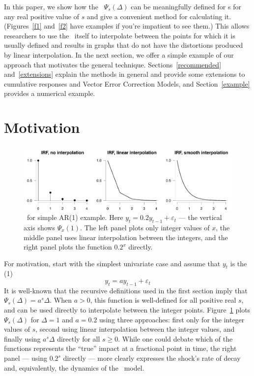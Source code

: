 \documentclass[12pt,fleqn]{article}
\newcommand{\vep}{\varepsilon}
\newcommand{\AR}{\allcaps{AR}}
\begin{document}
In this paper, we show how the \IRF\ $\Psi_s(\Delta)$ can be meaningfully
defined for \VAR s for any real positive value of $s$ and give a
convenient method for calculating it. (Figures~\ref{f1} and~\ref{f2}
have examples if you're impatient to see them.) This allows
researchers to use the \VAR\ itself to interpolate between the points
for which it is usually defined and results in graphs that do not have
the distortions produced by linear interpolation. In the next section,
we offer a simple example of our approach that motivates the general
technique. Sections~\ref{recommended} and~\ref{extensions} explain the
methods in general and provide some extensions to cumulative responses
and Vector Error Correction Models, and Section~\ref{example} provides
a numerical example.

\section{Motivation}

\begin{figure}[t]
  \centering
  \includegraphics{graphs/motivation.pdf}
  \caption{\IRF\ for simple AR(1) example. Here $y_t = 0.2 y_{t-1} +
    \vep_t$ --- the vertical axis shows $\Psi_x(1)$. The left panel
    plots only integer values of $x$, the middle panel uses linear
    interpolation between the integers, and the right panel plots the
    function $0.2^x$ directly.}
  \label{f0}
\end{figure}

For motivation, start with the simplest univariate case and assume
that $y_t$ is the \AR(1)
\begin{equation*}
y_t = a y_{t-1} + \vep_t
\end{equation*}
It is well-known that the recursive definitions used in the first
section imply that $\Psi_s(\Delta) = a^s \Delta$.  When $a > 0$, this
function is well-defined for all positive real $s$, and can be used
directly to interpolate between the integer points. Figure~\ref{f0}
plots $\Psi_s(\Delta)$ for $\Delta = 1$ and $a = 0.2$ using three
approaches: first only for the integer values of $s$, second using
linear interpolation between the integer values, and finally using
$a^s \Delta$ directly for all $s \geq 0$. While one could debate which
of the functions represents the ``true'' impact at a fractional point
in time, the right panel --- using $0.2^s$ directly --- more clearly
expresses the shock's rate of decay and, equivalently, the dynamics of
the \AR\ model.
\end{document}
